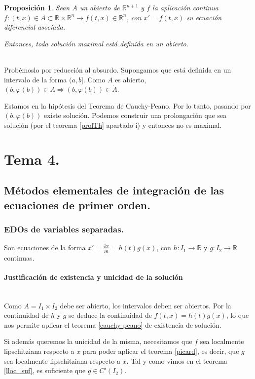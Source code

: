 \documentclass[11pt, a4paper,twoside]{article}
\makeatletter
\theoremstyle{theorem-style}  %
\newtheorem{proposition}[theorem]{Proposición}
\renewenvironment{proof}[1][\proofname]{\par
	\pushQED{\qed}%
	\normalfont \topsep6\p@\@plus6\p@\relax
	\list{}{%
		\settowidth{\leftmargin}{\quad:\hskip\labelsep}%
		\setlength{\labelwidth}{0pt}%
		\setlength{\itemindent}{-\leftmargin}%
	}%
	\item[\hskip\labelsep\itshape#1\@addpunct{:}]\ignorespaces
}{%
	\popQED\endlist\@endpefalse
}
\theoremstyle{definition-style}
\theoremstyle{example-style}
\let\oldsection\section
\def\section{\cleardoublepage\oldsection}
\makeatother
\begin{document}
\begin{proposition}
	Sean $ A $ un abierto de $ \mathbb{R}^{n+1} $ y $ f $ la aplicación continua $ f:(t,x)\in A\subset \mathbb{R}\times \mathbb{R}^n \longrightarrow f(t,x)\in \mathbb{R}^n $, con $  x'=f(t,x) $ su ecuación diferencial asociada. 
	
	Entonces, toda solución maximal está definida en un abierto.
\end{proposition}
\begin{proof}\ \\
	Probémoslo por reducción al absurdo. Supongamos que está definida en un intervalo de la forma $ (a,b] $.
	Como $ A $ es abierto, $ (b,\varphi(b))\in A \Rightarrow (b, \varphi(b)) \in \mathring{A} $.
	
	Estamos en la hipótesis del Teorema de Cauchy-Peano. Por lo tanto, pasando por $ (b, \varphi(b)) $ existe solución. Podemos construir una prolongación que sea solución (por el teorema \ref{prolTh} apartado i) y entonces no es maximal.
\end{proof}


\section{Tema 4.}
\subsection{Métodos elementales de integración de las ecuaciones de primer orden.}
\subsubsection{EDOs de variables separadas.}
Son ecuaciones de la forma $ x'=\frac{\partial x}{\partial t}=h(t)g(x) $, con $ h:I_1\longrightarrow\mathbb{R} $ y $ g:I_2\longrightarrow\mathbb{R} $ continuas. 
\paragraph{Justificación de existencia y unicidad de la solución} \ \\
Como $ A=I_1\times I_2 $ debe ser abierto, los intervalos deben ser abiertos. Por la continuidad de $ h $ y $ g $ se deduce la continuidad de $ f(t,x)=h(t)g(x) $, lo que nos permite aplicar el teorema \ref{cauchy-peano} de existencia de solución.

Si además queremos la unicidad de la misma, necesitamos que $ f $ sea localmente lipschitziana respecto a $ x $ para poder aplicar el teorema \ref{picard}, es decir, que $ g $ sea localmente lipschitziana respecto a $ x $. Tal y como vimos en el teorema \ref{lloc_suf}, es suficiente que $ g\in C'(I_2) $.
\end{document}
